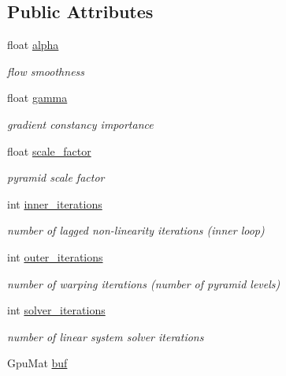 \subsection*{Public Attributes}
\begin{DoxyCompactItemize}
\item 
float \hyperlink{classcv_1_1gpu_1_1BroxOpticalFlow_a3cde47ad49aa16be21b776479d76e2a9}{alpha}
\begin{DoxyCompactList}\small\item\em flow smoothness \end{DoxyCompactList}\item 
float \hyperlink{classcv_1_1gpu_1_1BroxOpticalFlow_a38340441419110e891bbe148be6ca6ab}{gamma}
\begin{DoxyCompactList}\small\item\em gradient constancy importance \end{DoxyCompactList}\item 
float \hyperlink{classcv_1_1gpu_1_1BroxOpticalFlow_add237683953a02e7da3757aa555b7a9f}{scale\-\_\-factor}
\begin{DoxyCompactList}\small\item\em pyramid scale factor \end{DoxyCompactList}\item 
int \hyperlink{classcv_1_1gpu_1_1BroxOpticalFlow_ae6cd22cc2991f12a092a5887d769b5d7}{inner\-\_\-iterations}
\begin{DoxyCompactList}\small\item\em number of lagged non-\/linearity iterations (inner loop) \end{DoxyCompactList}\item 
int \hyperlink{classcv_1_1gpu_1_1BroxOpticalFlow_a93127c77d03b809ec869f3651162efc0}{outer\-\_\-iterations}
\begin{DoxyCompactList}\small\item\em number of warping iterations (number of pyramid levels) \end{DoxyCompactList}\item 
int \hyperlink{classcv_1_1gpu_1_1BroxOpticalFlow_a2d987464ab9a0919409047db591b64ad}{solver\-\_\-iterations}
\begin{DoxyCompactList}\small\item\em number of linear system solver iterations \end{DoxyCompactList}\item 
Gpu\-Mat \hyperlink{classcv_1_1gpu_1_1BroxOpticalFlow_a8966537234dabe1808b1b66d1dc8ab04}{buf}
\end{DoxyCompactItemize}


